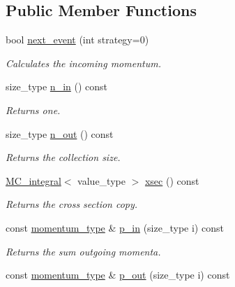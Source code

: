 \subsection*{Public Member Functions}
\begin{DoxyCompactItemize}
\item 
\hypertarget{a00376_a9ef470e4e676cc24e5c8cd1e001e23b8}{}bool \hyperlink{a00376_a9ef470e4e676cc24e5c8cd1e001e23b8}{next\+\_\+event} (int strategy=0)\label{a00376_a9ef470e4e676cc24e5c8cd1e001e23b8}

\begin{DoxyCompactList}\small\item\em Calculates the incoming momentum. \end{DoxyCompactList}\item 
\hypertarget{a00376_a78f829d46d2a0be7df59cde8bba60e7e}{}size\+\_\+type \hyperlink{a00376_a78f829d46d2a0be7df59cde8bba60e7e}{n\+\_\+in} () const \label{a00376_a78f829d46d2a0be7df59cde8bba60e7e}

\begin{DoxyCompactList}\small\item\em Returns one. \end{DoxyCompactList}\item 
\hypertarget{a00376_aa11e7e798696d5e672674405a0a23f9c}{}size\+\_\+type \hyperlink{a00376_aa11e7e798696d5e672674405a0a23f9c}{n\+\_\+out} () const \label{a00376_aa11e7e798696d5e672674405a0a23f9c}

\begin{DoxyCompactList}\small\item\em Returns the collection size. \end{DoxyCompactList}\item 
\hypertarget{a00376_a622c7de6df2afd843fb7016298708310}{}\hyperlink{a00368}{M\+C\+\_\+integral}$<$ value\+\_\+type $>$ \hyperlink{a00376_a622c7de6df2afd843fb7016298708310}{xsec} () const \label{a00376_a622c7de6df2afd843fb7016298708310}

\begin{DoxyCompactList}\small\item\em Returns the cross section copy. \end{DoxyCompactList}\item 
\hypertarget{a00376_a920894255910e9261d756491b8e7cd51}{}const \hyperlink{a00579}{momentum\+\_\+type} \& \hyperlink{a00376_a920894255910e9261d756491b8e7cd51}{p\+\_\+in} (size\+\_\+type i) const \label{a00376_a920894255910e9261d756491b8e7cd51}

\begin{DoxyCompactList}\small\item\em Returns the sum outgoing momenta. \end{DoxyCompactList}\item 
\hypertarget{a00376_aabb19ba169a79646496c2ec409b991b9}{}const \hyperlink{a00579}{momentum\+\_\+type} \& \hyperlink{a00376_aabb19ba169a79646496c2ec409b991b9}{p\+\_\+out} (size\+\_\+type i) const \label{a00376_aabb19ba169a79646496c2ec409b991b9}


\end{DoxyCompactItemize}
